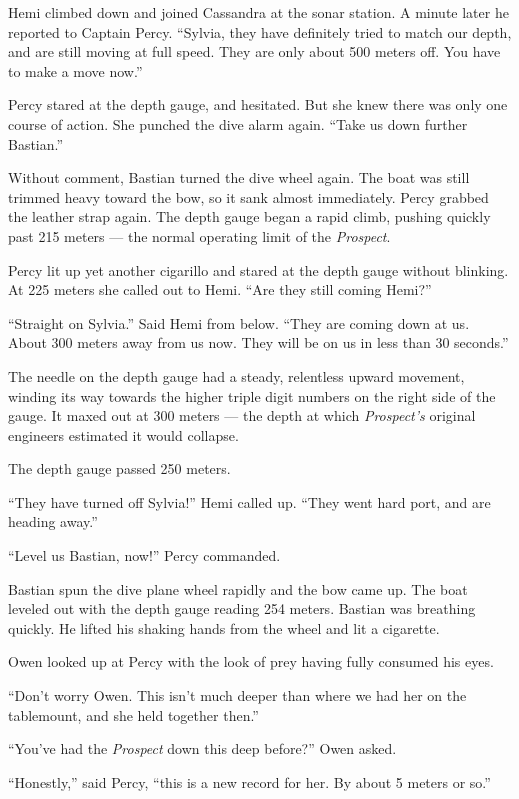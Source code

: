 \documentclass[]{scrbook}
\begin{document}
Hemi climbed down and joined Cassandra at the sonar station. A minute
later he reported to Captain Percy. ``Sylvia, they have definitely tried
to match our depth, and are still moving at full speed. They are only
about 500 meters off. You have to make a move now.''

Percy stared at the depth gauge, and hesitated. But she knew there was
only one course of action. She punched the dive alarm again. ``Take us
down further Bastian.''

Without comment, Bastian turned the dive wheel again. The boat was still
trimmed heavy toward the bow, so it sank almost immediately. Percy
grabbed the leather strap again. The depth gauge began a rapid climb,
pushing quickly past 215 meters --- the normal operating limit of the
\emph{Prospect}.

Percy lit up yet another cigarillo and stared at the depth gauge without
blinking. At 225 meters she called out to Hemi. ``Are they still coming
Hemi?''

``Straight on Sylvia.'' Said Hemi from below. ``They are coming down at
us. About 300 meters away from us now. They will be on us in less than
30 seconds.''

The needle on the depth gauge had a steady, relentless upward movement,
winding its way towards the higher triple digit numbers on the right
side of the gauge. It maxed out at 300 meters --- the depth at which
\emph{Prospect's} original engineers estimated it would collapse.

The depth gauge passed 250 meters.

``They have turned off Sylvia!'' Hemi called up. ``They went hard port,
and are heading away.''

``Level us Bastian, now!'' Percy commanded.

Bastian spun the dive plane wheel rapidly and the bow came up. The boat
leveled out with the depth gauge reading 254 meters. Bastian was
breathing quickly. He lifted his shaking hands from the wheel and lit a
cigarette.

Owen looked up at Percy with the look of prey having fully consumed his
eyes.

``Don't worry Owen. This isn't much deeper than where we had her on the
tablemount, and she held together then.''

``You've had the \emph{Prospect} down this deep before?'' Owen asked.

``Honestly,'' said Percy, ``this is a new record for her. By about 5
meters or so.''
\end{document}
